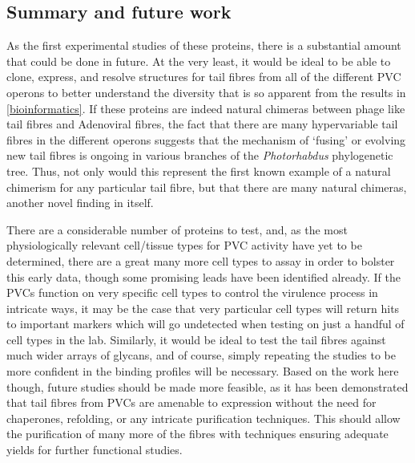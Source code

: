 \subsection{Summary and future work}
As the first experimental studies of these proteins, there is a substantial amount that could be done in future. At the very least, it would be ideal to be able to clone, express, and resolve structures for tail fibres from all of the different PVC operons to better understand the diversity that is so apparent from the results in \vref{bioinformatics}. If these proteins are indeed natural chimeras between phage like tail fibres and Adenoviral fibres, the fact that there are many hypervariable tail fibres in the different operons suggests that the mechanism of `fusing' or evolving new tail fibres is ongoing in various branches of the \emph{Photorhabdus} phylogenetic tree. Thus, not only would this represent the first known example of a natural chimerism for any particular tail fibre, but that there are many natural chimeras, another novel finding in itself.

There are a considerable number of proteins to test, and, as the most physiologically relevant cell/tissue types for PVC activity have yet to be determined, there are a great many more cell types to assay in order to bolster this early data, though some promising leads have been identified already. If the PVCs function on very specific cell types to control the virulence process in intricate ways, it may be the case that very particular cell types will return hits to important markers which will go undetected when testing on just a handful of cell types in the lab. Similarly, it would be ideal to test the tail fibres against much wider arrays of glycans, and of course, simply repeating the studies to be more confident in the binding profiles will be necessary. Based on the work here though, future studies should be made more feasible, as it has been demonstrated that tail fibres from PVCs are amenable to expression without the need for chaperones, refolding, or any intricate purification techniques. This should allow the purification of many more of the fibres with techniques ensuring adequate yields for further functional studies.


